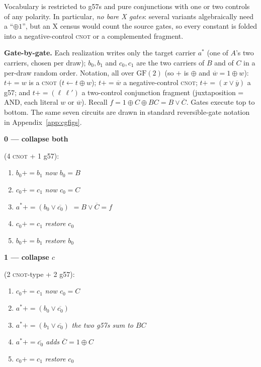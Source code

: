 \documentclass[11pt]{article}
\newcommand{\CNOT}{\textsc{cnot}}
\newcommand{\gf}{\mathrm{GF}(2)}
\newcommand{\pe}{\mathrel{{+}{=}}}    %
\newcommand{\at}{a^{\ast}}            %
\begin{document}
Vocabulary is restricted to g57s and pure conjunctions with one or two
controls of any polarity. In particular, \emph{no bare X gates}: several
variants algebraically need a ``$\oplus 1$'', but an X census would count
the source gates, so every constant is folded into a negative-control
\CNOT{} or a complemented fragment.

\textbf{Gate-by-gate.} Each realization writes only the target carrier
$\at$ (one of $A$'s two carriers, chosen per draw); $b_0, b_1$ and $c_0,
c_1$ are the two carriers of $B$ and of $C$ in a per-draw random order.
Notation, all over $\gf$ (so $+$ is $\oplus$ and $\overline{w} = 1 \oplus
w$): $t \pe w$ is a \CNOT{} ($t \leftarrow t \oplus w$); $t \pe
\overline{w}$ a negative-control \CNOT{}; $t \pe (x \vee \overline{y})$ a
g57; and $t \pe (\ell\,\ell')$ a two-control conjunction fragment
(juxtaposition = AND, each literal $w$ or $\overline{w}$). Recall $f = 1
\oplus C \oplus BC = B \vee \overline{C}$. Gates execute top to bottom. The
same seven circuits are drawn in standard reversible-gate notation in
Appendix~\ref{app:cgfigs}.

\newcommand{\note}[1]{\hfill{\footnotesize\itshape #1}}
\newcommand{\cgvar}[1]{\smallskip\noindent\textbf{#1}\par\nopagebreak}

\cgvar{0 --- collapse both} (4 \CNOT{} + 1 g57):
\begin{enumerate}\itemsep1pt
\item $b_0 \pe b_1$ \note{now $b_0 = B$}
\item $c_0 \pe c_1$ \note{now $c_0 = C$}
\item $\at \pe (b_0 \vee \overline{c_0})$ \note{$= B \vee \overline{C} = f$}
\item $c_0 \pe c_1$ \note{restore $c_0$}
\item $b_0 \pe b_1$ \note{restore $b_0$}
\end{enumerate}

\cgvar{1 --- collapse $c$} (2 \CNOT{}-type + 2 g57):
\begin{enumerate}\itemsep1pt
\item $c_0 \pe c_1$ \note{now $c_0 = C$}
\item $\at \pe (b_0 \vee \overline{c_0})$
\item $\at \pe (b_1 \vee \overline{c_0})$ \note{the two g57s sum to $BC$}
\item $\at \pe \overline{c_0}$ \note{adds $\overline{C} = 1 \oplus C$}
\item $c_0 \pe c_1$ \note{restore $c_0$}
\end{enumerate}
\end{document}
